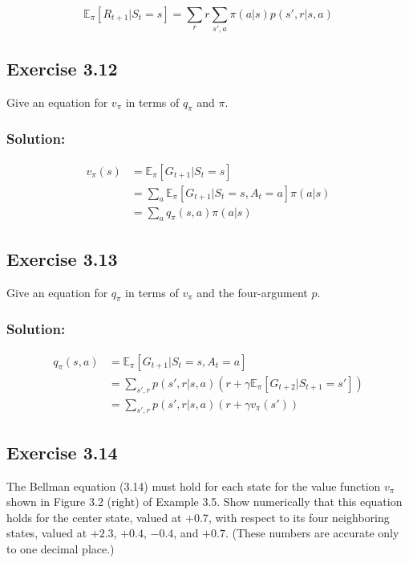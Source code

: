 \[
    \mathbb{E}_{\pi} \left[R_{t+1} | S_t = s \right] = \sum_r r  \sum_{s', a} \pi(a|s) p(s', r | s, a)
\]

\subsection*{Exercise 3.12}
Give an equation for $v_\pi$ in terms of $q_\pi$ and $\pi$.

\subsubsection*{Solution:}
\begin{align*}
    v_\pi(s)&=\mathbb{E}_{\pi} \left[G_{t+1} | S_t = s \right] \\
    &= \sum_a \mathbb{E}_{\pi} \left[G_{t+1} | S_t = s, A_t = a \right] \pi(a|s)\\
    &= \sum_a q_\pi(s,a) \pi(a|s)
\end{align*}

\subsection*{Exercise 3.13}
Give an equation for $q_\pi$ in terms of $v_\pi$ and the four-argument $p$.

\subsubsection*{Solution:}

\begin{align*}
    q_\pi(s, a) &= \mathbb{E}_{\pi} \left[G_{t+1} | S_t = s, A_t = a \right] \\
    &= \sum_{s',r} p(s', r | s, a) (r + \gamma \mathbb{E}_{\pi} \left[G_{t+2} | S_{t+1} = s' \right]) \\
    &= \sum_{s',r} p(s', r | s, a) (r + \gamma v_\pi(s'))
\end{align*}


\subsection*{Exercise 3.14}
The Bellman equation (3.14) must hold for each state for the value function
$v_\pi$ shown in Figure 3.2 (right) of Example 3.5. Show numerically that this equation holds
for the center state, valued at $+0.7$, with respect to its four neighboring states, valued at
$+2.3$, $+0.4$,  $-0.4$, and $+0.7$. (These numbers are accurate only to one decimal place.)

